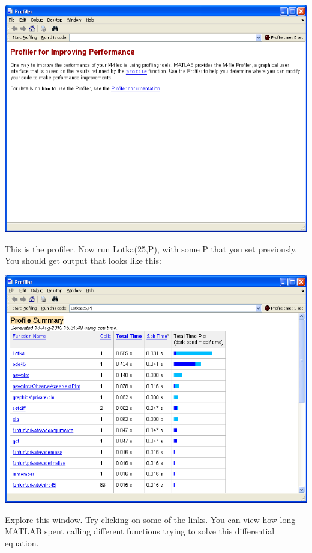 \begin{center}
\includegraphics[scale = .7]{./Figures/blankProfile}
\end{center}

This is the profiler. Now run Lotka(25,P), with some P that you set previously. You should get output that looks like this:

\begin{center}
\includegraphics[scale = .7]{./Figures/LotkaProfile}
\end{center}

Explore this window. Try clicking on some of the links. You can view how long MATLAB spent calling different functions trying to solve this differential equation.

